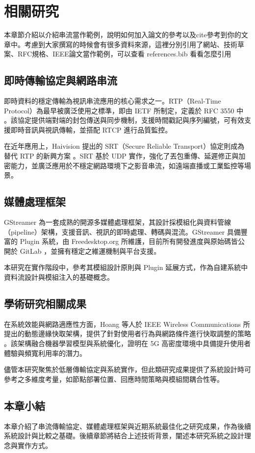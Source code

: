 \chapter{相關研究}

本章節介紹以介紹串流當作範例，說明如何加入論文的參考以及cite參考到你的文章中。考慮到大家撰寫的時候會有很多資料來源，這裡分別引用了網站、技術草案、RFC規格、IEEE論文當作範例，可以查看 references.bib 看看怎麼引用

\section{即時傳輸協定與網路串流}

即時資料的穩定傳輸為視訊串流應用的核心需求之一。RTP（Real-Time Protocol）為最早被廣泛使用之標準，即由 IETF 所制定，定義於 RFC 3550 中 \cite{rfc3550}。該協定提供端對端的封包傳送與同步機制，支援時間戳記與序列編號，可有效支援即時音訊與視訊傳輸，並搭配 RTCP 進行品質監控。

在近年應用上，Haivision 提出的 SRT（Secure Reliable Transport）協定則成為替代 RTP 的新興方案 \cite{srt-protocol}。SRT 基於 UDP 實作，強化了丟包重傳、延遲修正與加密能力，並廣泛應用於不穩定網路環境下之影音串流，如遠端直播或工業監控等場景。

\section{媒體處理框架}

GStreamer 為一套成熟的開源多媒體處理框架，其設計採模組化與資料管線（pipeline）架構，支援音訊、視訊的即時處理、轉碼與混流。GStreamer 具備豐富的 Plugin 系統，由 Freedesktop.org 所維護，目前所有開發進度與原始碼皆公開於 GitLab \cite{gstreamer-gitlab}，並擁有穩定之維運機制與平台支援。

本研究在實作階段中，參考其模組設計原則與 Plugin 延展方式，作為自建系統中資料流設計與模組注入的基礎概念。

\section{學術研究相關成果}

在系統效能與網路適應性方面，Hoang 等人於 IEEE Wireless Communications 所提出的動態邊緣快取架構，提供了針對使用者行為與網路條件進行快取調整的策略 \cite{hoang2018dynamic}。該架構融合機器學習模型與系統優化，證明在 5G 高密度環境中具備提升使用者體驗與頻寬利用率的潛力。

儘管本研究聚焦於低層傳輸協定與系統實作，但此類研究成果提供了系統設計時可參考之多維度考量，如節點部署位置、回應時間策略與模組間耦合性等。

\section{本章小結}

本章介紹了串流傳輸協定、媒體處理框架與近期系統最佳化之研究成果，作為後續系統設計與比較之基礎。後續章節將結合上述技術背景，闡述本研究系統之設計理念與實作方式。
